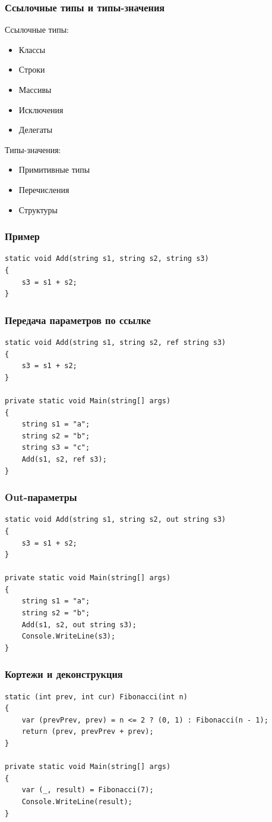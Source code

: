 \documentclass[xetex,mathserif,serif]{beamer}
\begin{document}
	\begin{frame}
		\frametitle{Ссылочные типы и типы-значения}
		Ссылочные типы:
		\begin{itemize}
			\item Классы
			\item Строки
			\item Массивы
			\item Исключения
			\item Делегаты
		\end{itemize}
		Типы-значения:
		\begin{itemize}
			\item Примитивные типы
			\item Перечисления
			\item Структуры
		\end{itemize}
	\end{frame}

	\begin{frame}[fragile]
		\frametitle{Пример}
		\begin{verbatim}
static void Add(string s1, string s2, string s3)
{
    s3 = s1 + s2;
}
		\end{verbatim}
\end{frame}

	\begin{frame}[fragile]
		\frametitle{Передача параметров по ссылке}
		\begin{verbatim}
static void Add(string s1, string s2, ref string s3)
{
    s3 = s1 + s2;
}

private static void Main(string[] args)
{
    string s1 = "a";
    string s2 = "b";
    string s3 = "c";
    Add(s1, s2, ref s3);
}
		\end{verbatim}
\end{frame}

	\begin{frame}[fragile]
		\frametitle{Out-параметры}
		\begin{verbatim}
static void Add(string s1, string s2, out string s3)
{
    s3 = s1 + s2;
}

private static void Main(string[] args)
{
    string s1 = "a";
    string s2 = "b";
    Add(s1, s2, out string s3);
    Console.WriteLine(s3);
}
		\end{verbatim}
\end{frame}

	\begin{frame}[fragile]
		\frametitle{Кортежи и деконструкция}
		\begin{verbatim}
static (int prev, int cur) Fibonacci(int n)
{
    var (prevPrev, prev) = n <= 2 ? (0, 1) : Fibonacci(n - 1);
    return (prev, prevPrev + prev);
}

private static void Main(string[] args)
{
    var (_, result) = Fibonacci(7);
    Console.WriteLine(result);
}
		\end{verbatim}
\end{frame}
\end{document}
